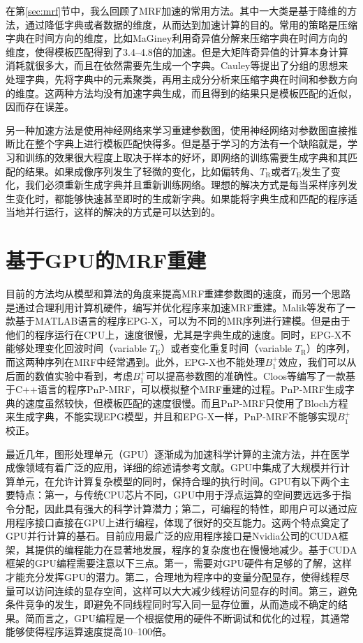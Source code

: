 在第\ref{sec:mrf}节中，我么回顾了MRF加速的常用方法。其中一大类是基于降维的方法，通过降低字典或者数据的维度，从而达到加速计算的目的。常用的策略是压缩字典在时间方向的维度，比如MaGiney\cite{svdmrf}利用奇异值分解来压缩字典在时间方向的维度，使得模板匹配得到了3.4--4.8倍的加速。但是大矩阵奇异值的计算本身计算消耗就很多大，而且在依然需要先生成一个字典。Cauley等\cite{groupingmrf}提出了分组的思想来处理字典，先将字典中的元素聚类，再用主成分分析来压缩字典在时间和参数方向的维度。这两种方法均没有加速字典生成，而且得到的结果只是模板匹配的近似，因而存在误差。

另一种加速方法是使用神经网络来学习重建参数图\cite{cohen2018mr}，使用神经网络对参数图直接推断比在整个字典上进行模板匹配快得多。但是基于学习的方法有一个缺陷就是，学习和训练的效果很大程度上取决于样本的好坏，即网络的训练需要生成字典和其匹配的结果。如果成像序列发生了轻微的变化，比如偏转角、$T_\mathrm{R}$或者$T_\mathrm{E}$发生了变化，我们必须重新生成字典并且重新训练网络。理想的解决方式是每当采样序列发生变化时，都能够快速甚至即时的生成新字典。如果能将字典生成和匹配的程序适当地并行运行，这样的解决的方式是可以达到的。

\section{基于GPU的MRF重建}
目前的方法均从模型和算法的角度来提高MRF重建参数图的速度，而另一个思路是通过合理利用计算机硬件，编写并优化程序来加速MRF重建。Malik等\cite{malik_extended_2018}发布了一款基于MATLAB语言的程序EPG-X，可以为不同的MR序列进行建模。但是由于他们的程序运行在CPU上，速度很慢，尤其是字典生成的速度。同时，EPG-X不能够处理变化回波时间（variable $T_\mathrm{E}$）或者变化重复时间（variable $T_\mathrm{R}$）的序列，而这两种序列在MRF中经常遇到。此外，EPG-X也不能处理$B_1^+$效应，我们可以从后面的数值实验中看到，考虑$B_1^+$可以提高参数图的准确性。Cloos\cite{cline2017air}等编写了一款基于C++语言的程序PnP-MRF，可以模拟整个MRF重建的过程。PnP-MRF生成字典的速度虽然较快，但模板匹配的速度很慢。而且PnP-MRF只使用了Bloch方程来生成字典，不能实现EPG模型，并且和EPG-X一样，PnP-MRF不能够实现$B_1^+$校正。

最近几年，图形处理单元（GPU）逐渐成为加速科学计算的主流方法，并在医学成像领域有着广泛的应用，详细的综述请参考文献\cite{gpu}。GPU中集成了大规模并行计算单元，在允许计算复杂模型的同时，保持合理的执行时间。GPU有以下两个主要特点：第一，与传统CPU芯片不同，GPU中用于浮点运算的空间要远远多于指令分配，因此具有强大的科学计算潜力；第二，可编程的特性，即用户可以通过应用程序接口直接在GPU上进行编程，体现了很好的交互能力。这两个特点奠定了GPU并行计算的基石。目前应用最广泛的应用程序接口是Nvidia公司的CUDA框架，其提供的编程能力在显著地发展，程序的复杂度也在慢慢地减少。基于CUDA框架的GPU编程需要注意以下三点。第一，需要对GPU硬件有足够的了解，这样才能充分发挥GPU的潜力。第二，合理地为程序中的变量分配显存，使得线程尽量可以访问连续的显存空间，这样可以大大减少线程访问显存的时间。第三，避免条件竞争的发生，即避免不同线程同时写入同一显存位置，从而造成不确定的结果。简而言之，GPU编程是一个根据使用的硬件不断调试和优化的过程，其通常能够使得程序运算速度提高10--100倍。

